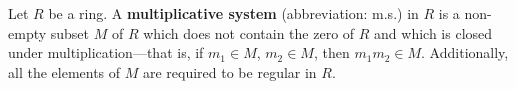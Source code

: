 Let $R$ be a ring. A \textbf{multiplicative system} (abbreviation: m.s.) in $R$ is a non-empty subset $M$ of $R$ which does not contain the zero of $R$ and which is closed under multiplication—that is, if $m_1 \in M$, $m_2 \in M$, then $m_1m_2 \in M$. Additionally, all the elements of $M$ are required to be regular in $R$.
